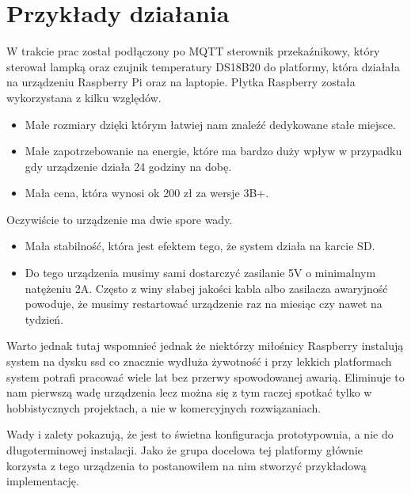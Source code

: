 \chapter{Przykłady działania}
W trakcie prac został podłączony po MQTT sterownik przekaźnikowy, który sterował lampką oraz czujnik temperatury DS18B20 do platformy, która działała na urządzeniu Raspberry Pi oraz na laptopie. Płytka Raspberry została wykorzystana z kilku względów. 
\begin{itemize}
    \item Małe rozmiary dzięki którym łatwiej nam znaleźć dedykowane stałe miejsce.
    \item Małe zapotrzebowanie na energie, które ma bardzo duży wpływ w przypadku gdy urządzenie działa 24 godziny na dobę.
    \item Mała cena, która wynosi ok 200 zł za wersje 3B+.
\end{itemize}
Oczywiście to urządzenie ma dwie spore wady.
\begin{itemize}
    \item Mała stabilność, która jest efektem tego, że system działa na karcie SD.
    \item Do tego urządzenia musimy sami dostarczyć zasilanie 5V o minimalnym natężeniu 2A. Często z winy słabej jakości kabla albo zasilacza awaryjność powoduje, że musimy restartować urządzenie raz na miesiąc czy nawet na tydzień.
\end{itemize}
Warto jednak tutaj wspomnieć jednak że niektórzy miłośnicy Raspberry instalują system na dysku ssd co znacznie wydłuża żywotność i przy lekkich platformach system potrafi pracować wiele lat bez przerwy spowodowanej awarią. Eliminuje to nam pierwszą wadę urządzenia lecz można się z tym raczej spotkać tylko w hobbistycznych projektach, a nie w komercyjnych rozwiązaniach.
\par
Wady i zalety pokazują, że jest to świetna konfiguracja prototypownia, a nie do długoterminowej instalacji. Jako że grupa docelowa tej platformy głównie korzysta z tego urządzenia to postanowiłem na nim stworzyć przykładową implementację.
\newpage
